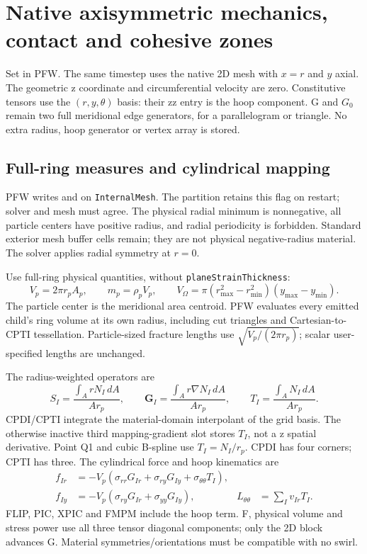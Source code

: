 \section{Native axisymmetric mechanics, contact and cohesive zones}
\label{sec:axisymmetric}
Set  in PFW. The same timestep uses the
native 2D mesh with $x=r$ and $y$ axial. The geometric z coordinate and
circumferential velocity are zero. Constitutive tensors use the
$(r,y,\theta)$ basis: their zz entry is the hoop component. G and $G_0$
remain two full meridional edge generators, for a parallelogram or triangle.
No extra radius, hoop generator or vertex array is stored.

\subsection{Full-ring measures and cylindrical mapping}
PFW writes  and  on
\texttt{InternalMesh}. The partition retains this flag on restart; solver and
mesh must agree. The physical radial minimum is nonnegative, all particle
centers have positive radius, and radial periodicity is forbidden. Standard
exterior mesh buffer cells remain; they are not physical negative-radius
material. The solver applies radial symmetry at $r=0$.

Use full-ring physical quantities, without \texttt{planeStrainThickness}:
\[
 V_p=2\pi r_p A_p,\qquad m_p=\rho_p V_p,\qquad
 V_\Omega=\pi(r_{\max}^2-r_{\min}^2)(y_{\max}-y_{\min}).
\]
The particle center is the meridional area centroid. PFW evaluates every
emitted child's ring volume at its own radius, including cut triangles and
Cartesian-to-CPTI tessellation. Particle-sized fracture lengths use
$\sqrt{V_p/(2\pi r_p)}$; scalar user-specified lengths are unchanged.

The radius-weighted operators are
\[
 S_I=\frac{\int_A r N_I\,dA}{A r_p},\qquad
 \mathbf G_I=\frac{\int_A r\nabla N_I\,dA}{A r_p},\qquad
 T_I=\frac{\int_A N_I\,dA}{A r_p}.
\]
CPDI/CPTI integrate the material-domain interpolant of the grid basis. The
otherwise inactive third mapping-gradient slot stores $T_I$, not a z
spatial derivative. Point Q1 and cubic B-spline use $T_I=N_I/r_p$. CPDI has four corners;
CPTI has three. The cylindrical force and hoop kinematics are
\begin{align*}
 f_{Ir}&=-V_p(\sigma_{rr}G_{Ir}+\sigma_{ry}G_{Iy}+\sigma_{\theta\theta}T_I),\\
 f_{Iy}&=-V_p(\sigma_{ry}G_{Ir}+\sigma_{yy}G_{Iy}),&
 L_{\theta\theta}&=\sum_I v_{Ir}T_I.
\end{align*}
FLIP, PIC, XPIC and FMPM include the hoop term. F, physical volume and stress
power use all three tensor diagonal components; only the 2D block advances G.
Material symmetries/orientations must be compatible with no swirl.

